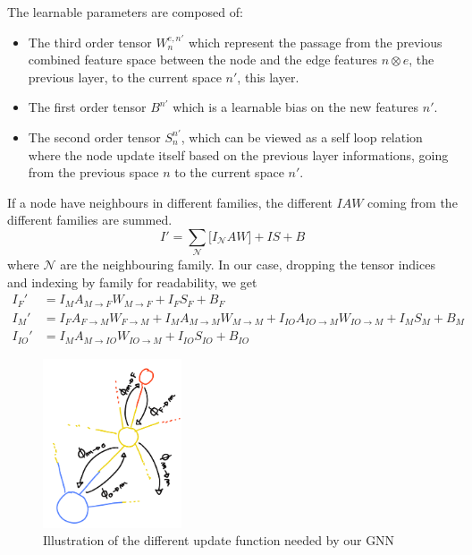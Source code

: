 \documentclass[../main.tex]{subfiles}
\begin{document}
The learnable parameters are composed of:
\begin{itemize}
  \item The third order tensor $W_n^{e,n'}$ which represent the passage from the previous combined feature space between the node and the edge features $n \otimes e$, the previous layer, to the current space $n'$, this layer.
  \item The first order tensor $B^{n'}$ which is a learnable bias on the new features $n'$.
  \item The second order tensor $S^{n'}_n$, which can be viewed as a self loop relation where the node update itself based on the previous layer informations, going from the previous space $n$ to the current space $n'$.
\end{itemize}

If a node have neighbours in different families, the different $IAW$ coming from the different families are summed.
\begin{equation}
  \label{eq:jgnn:multi_fam}
  I' = \sum_\mathcal{N} \bigg[ I_{\mathcal{N}}AW \bigg] + IS + B
\end{equation}
where $\mathcal{N}$ are the neighbouring family.
In our case, dropping the tensor indices and indexing by family for readability, we get
\begin{align}
  I_F' &= I_M A_{M \rightarrow F} W_{M \rightarrow F} + I_F S_F + B_F \\
  I_M' &= I_F A_{F \rightarrow M} W_{F \rightarrow M} + I_M A_{M \rightarrow M} W_{M \rightarrow M} + I_{IO} A_{IO \rightarrow M} W_{IO \rightarrow M} + I_M S_M + B_M \\
  I_{IO}' &= I_M A_{M \rightarrow IO} W_{IO \rightarrow M} + I_{IO} S_{IO} + B_{IO}
\end{align}

\begin{figure}
  \centering
  \includegraphics[height=5cm]{images/jgnn/mp_illus.png}
  \caption{Illustration of the different update function needed by our GNN}
  \label{fig:jgnn:mp_ill}
\end{figure}
\end{document}
